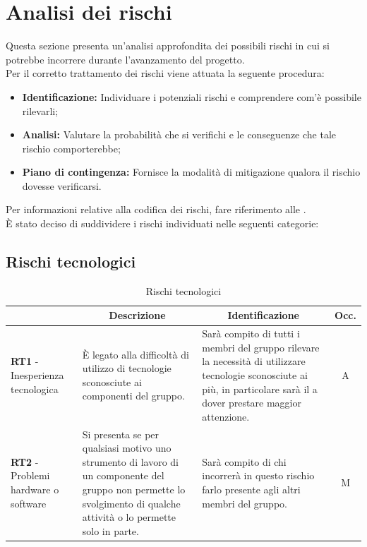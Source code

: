 \section{Analisi dei rischi} \label{section:analisi_dei_rischi}
Questa sezione presenta un'analisi approfondita dei possibili rischi in cui si potrebbe incorrere durante l'avanzamento del progetto.\\
Per il corretto trattamento dei rischi viene attuata la seguente procedura:
\begin{itemize}
  \item \textbf{Identificazione:} Individuare i potenziali rischi e comprendere com'è possibile rilevarli;
  \item \textbf{Analisi:} Valutare la probabilità che si verifichi e le conseguenze che tale rischio comporterebbe;
  \item \textbf{Piano di contingenza:} Fornisce la modalità di mitigazione qualora il rischio dovesse verificarsi.
\end{itemize}
Per informazioni relative alla codifica dei rischi, fare riferimento alle \docNameVersionNdP{}.\\
È stato deciso di suddividere i rischi individuati nelle seguenti categorie:

\subsection{Rischi tecnologici} \label{subsection:rischi_tecnologici}
\begin{table}[H]
  \centering
  \renewcommand{\arraystretch}{1.8}
  \begin{tabular}{p{5.5cm}|p{5cm}|p{5cm}|c}
    \rowcolor[HTML]{125E28} 
    \multicolumn{1}{c}{\color[HTML]{FFFFFF}\textbf{Codice}}
    & \multicolumn{1}{c}{\color[HTML]{FFFFFF}\textbf{Descrizione}}
    & \multicolumn{1}{c}{\color[HTML]{FFFFFF}\textbf{Identificazione}}
    & \color[HTML]{FFFFFF}\textbf{Occ.}\\
    \hline
    \textbf{RT1} - Inesperienza tecnologica & È legato alla difficoltà di utilizzo di tecnologie sconosciute ai componenti del gruppo. & Sarà compito di tutti i membri del gruppo rilevare la necessità di utilizzare tecnologie sconosciute ai più, in particolare sarà il \roleProjectManagerLow{} a dover prestare maggior attenzione. & A \\
    \textbf{RT2} - Problemi hardware o software & Si presenta se per qualsiasi motivo uno strumento di lavoro di un componente del gruppo non permette lo svolgimento di qualche attività o lo permette solo in parte. &  Sarà compito di chi incorrerà in questo rischio farlo presente agli altri membri del gruppo. & M \\
  \end{tabular}
  \caption{Rischi tecnologici}
\end{table}

